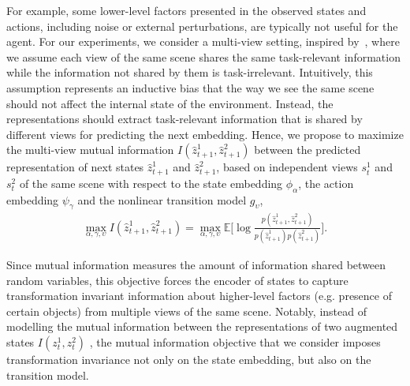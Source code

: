 \documentclass[a4paper,12pt]{article}
\begin{document}
For example, some lower-level factors presented in the observed states and actions, including noise or external perturbations, are typically not useful for the agent. For our experiments, we consider a multi-view setting, inspired by~\citet{laskin2020curl}, where we assume each view of the same scene shares the same task-relevant information while the information not shared by them is task-irrelevant. Intuitively, this assumption represents an inductive bias that the way we see the same scene should not affect the internal state of the environment. Instead, the representations should extract task-relevant information that is shared by different views for predicting the next embedding. Hence, we propose to maximize the multi-view mutual information $I(\hat{z}_{t+1}^1, \hat{z}_{t+1}^2)$ between the predicted representation of next states $\hat{z}_{t+1}^1$ and $\hat{z}_{t+1}^2$, based on independent views $s_t^1$ and $s_t^2$ of the same scene with respect to the state embedding $\phi_\alpha$, the action embedding $\psi_\gamma$ and the nonlinear transition model $g_\upsilon$,
\begin{equation} \label{eq:MVMI}
\begin{split}
     \max_{\alpha, \gamma, \upsilon}I(\hat{z}_{t+1}^1, \hat{z}_{t+1}^2)  = \max_{\alpha, \gamma, \upsilon} \mathbb{E} \bigg[\log\frac{p(\hat{z}_{t+1}^1,\hat{z}_{t+1}^2)}{p(\hat{z}_{t+1}^1)p(\hat{z}_{t+1}^2)} \bigg].
\end{split}
\end{equation}

Since mutual information measures the amount of information shared between random variables, this objective forces the encoder of states to capture transformation invariant information about higher-level factors (e.g. presence of certain objects) from multiple views of the same scene. Notably, instead of modelling the mutual information between the representations of two augmented states $I(z_t^1, z_t^2)$ \cite{laskin2020curl}, the mutual information objective that we consider imposes transformation invariance not only on the state embedding, but also on the transition model.
\end{document}
